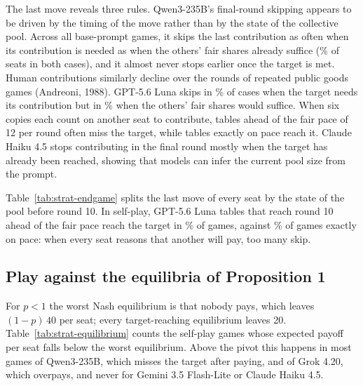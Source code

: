 \documentclass[10pt]{article}
\let\plainsubsection\subsection
\renewcommand{\subsection}{\FloatBarrier\needspace{8\baselineskip}\plainsubsection}
\begin{document}
The last move reveals three rules. Qwen3-235B’s final-round skipping appears to be driven by the timing of the move rather than by the state of the collective pool. Across all base-prompt games, it skips the last  contribution as often when its  contribution is needed as when the others' fair shares already suffice (\StratQwenZeroPivotal\% of seats in both cases), and it almost never stops earlier once the target is met. Human contributions similarly decline over the rounds of repeated public goods games (Andreoni, 1988). GPT-5.6 Luna skips in \StratLunaZeroPivotal\% of cases when the target needs its  contribution but in \StratLunaZeroSlack\% when the others' fair shares would suffice. When six copies each count on another seat to contribute, tables ahead of the fair pace of 12 per round often miss the target, while tables exactly on pace reach it. Claude Haiku 4.5 stops contributing in the final round mostly when the target has already been reached, showing that models can infer the current pool size from the prompt.

Table~\ref{tab:strat-endgame} splits the last move of every seat by the state of the pool before round 10. In self-play, GPT-5.6 Luna tables that reach round 10 ahead of the fair pace reach the target in \StratLunaAheadReach{}\% of \StratLunaAheadN{} games, against \StratLunaOnPaceReach{}\% of \StratLunaOnPaceN{} games exactly on pace: when every seat reasons that another will pay, too many skip.

\begin{table}[h]
\caption{Share of seats paying nothing in round 10, by the state of the pool after round 9, and in rounds 7 to 9 once the pool has reached 120, with 95\% bootstrap intervals over games in the table file.}
\label{tab:strat-endgame}
\centering\small

\end{table}

\subsection{Play against the equilibria of Proposition 1}

For $p<1$ the worst Nash equilibrium is that nobody pays, which leaves $(1-p)\,40$ per seat; every target-reaching equilibrium leaves 20. Table~\ref{tab:strat-equilibrium} counts the self-play games whose expected payoff per seat falls below the worst equilibrium. Above the pivot this happens in most games of Qwen3-235B, which misses the target after paying, and of Grok 4.20, which overpays, and never for Gemini 3.5 Flash-Lite or Claude Haiku 4.5.
\end{document}
